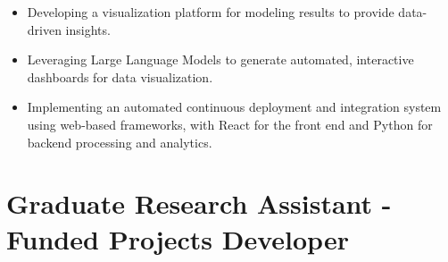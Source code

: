 \documentclass[10pt, letterpaper]{article}
\newenvironment{highlights}{
    \begin{itemize}[
        topsep=0.10 cm,
        parsep=0.10 cm,
        partopsep=0pt,
        itemsep=0pt,
        leftmargin=0 cm + 10pt
    ]
}{
    \end{itemize}
} %
\begin{document}
    \begin{highlights}  
        \item Developing a visualization platform for modeling results to provide data-driven insights.  
        \item Leveraging Large Language Models to generate automated, interactive dashboards for data visualization.  
        \item Implementing an automated continuous deployment and integration system using web-based frameworks, with React for the front end and Python for backend processing and analytics.  
    \end{highlights}  
    
        \vspace{0.3cm} 




    \section*{Graduate Research Assistant - Funded Projects Developer}
    \small
\end{document}
